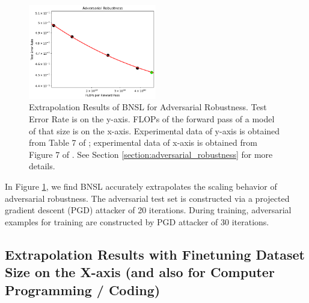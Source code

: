 \documentclass{article} %
\begin{document}
\vspace{-4.0mm}

\begin{figure}[htbp]
    \centering
\includegraphics[width=0.497\textwidth]{figures/adversarial_robustness/adversarial_robustness__pgd_20.png}
\vspace{-4.5mm}
    \caption{
Extrapolation Results of BNSL for Adversarial Robustness. Test Error Rate is on the y-axis. FLOPs of the forward pass of a model of that size is on the x-axis. Experimental data of y-axis is obtained from Table 7 of \cite{Xie2020Intriguing}; experimental data of x-axis is obtained from Figure 7 of \cite{Xie2020Intriguing}. See Section \ref{section:adversarial_robustness} for more details.
    }
    \label{fig:adversarial_robustness}
\end{figure}

\vspace{-2.5mm}

In Figure \ref{fig:adversarial_robustness}, we find BNSL accurately extrapolates the scaling behavior of adversarial robustness. The adversarial test set is constructed via a projected gradient descent (PGD) attacker \citep{madry2018towards} of 20 iterations. During training, adversarial examples for training are constructed by PGD attacker of 30 iterations.

\clearpage

\subsection{Extrapolation Results with Finetuning Dataset Size on the X-axis (and also for Computer Programming / Coding)}
\label{section:finetuning}
\end{document}
